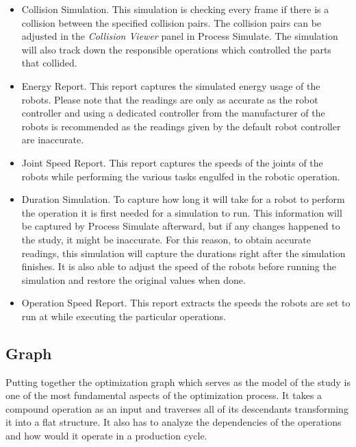 \begin{itemize}

\item Collision Simulation. This simulation is checking every frame if there is a collision between the specified collision pairs. The collision pairs can be adjusted in the \emph{Collision Viewer} panel in Process Simulate. The simulation will also track down the responsible operations which controlled the parts that collided.

\item Energy Report. This report captures the simulated energy usage of the robots. Please note that the readings are only as accurate as the robot controller and using a dedicated controller from the manufacturer of the robots is recommended as the readings given by the default robot controller are inaccurate.

\item Joint Speed Report. This report captures the speeds of the joints of the robots while performing the various tasks engulfed in the robotic operation.

\item Duration Simulation. To capture how long it will take for a robot to perform the operation it is first needed for a simulation to run. This information will be captured by Process Simulate afterward, but if any changes happened to the study, it might be inaccurate. For this reason, to obtain accurate readings, this simulation will capture the durations right after the simulation finishes. It is also able to adjust the speed of the robots before running the simulation and restore the original values when done. 

\item Operation Speed Report. This report extracts the speeds the robots are set to run at while executing the particular operations. 

\end{itemize}

\subsection{Graph}

Putting together the optimization graph which serves as the model of the study is one of the most fundamental aspects of the optimization process. It takes a compound operation as an input and traverses all of its descendants transforming it into a flat structure. It also has to analyze the dependencies of the operations and how would it operate in a production cycle. \\

